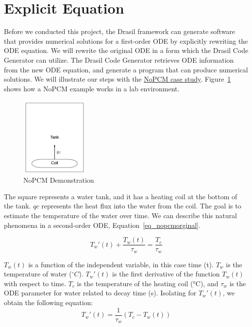 \section{Explicit Equation}
Before we conducted this project, the Drasil framework can generate software that provides numerical solutions for a first-order ODE by explicitly rewriting the ODE equation. We will rewrite the original ODE in a form which the Drasil Code Generator can utilize. The Drasil Code Generator retrieves ODE information from the new ODE equation, and generate a program that can produce numerical solutions. We will illustrate our steps with the \href{https://jacquescarette.github.io/Drasil/examples/nopcm/SRS/srs/NoPCM_SRS.html#Sec:IMs}{NoPCM case study}. Figure~\ref{fig_nopcm} shows how a NoPCM example works in a lab environment.
\begin{figure}[ht]
\centering
\includegraphics[width=0.3\textwidth]{figures/NoPCM.png}
\caption{NoPCM Demonstration}
\label{fig_nopcm}
\end{figure}
The square represents a water tank, and it has a heating coil at the bottom of the tank. $qc$ represents the heat flux into the water from the coil. The goal is to estimate the temperature of the water over time. We can describe this natural phenomena in a second-order ODE, Equation~\ref{eq_nopcmorginal}.

\begin{equation} \label{eq_nopcmorginal}
	T_{w}'(t) +  \frac {T_{w}(t)}{\tau_{w}} = \frac{T_{c}}{\tau_{w}}
\end{equation}

$T_w(t)$ is a function of the independent variable, in this case time (t). $T_w$ is the temperature of water ($ ^\circ C $). $T_w'(t)$ is the first derivative of the function $T_w(t)$ with respect to time. $T_c$ is the temperature of the heating coil (°C), and $\tau_w$ is the ODE parameter for water related to decay time (s). Isolating for $T_w'(t)$, we obtain the following equation:
\begin{equation} \label{eq_nopcmderive}
	T_{w}'(t) = \frac{1}{\tau_{w}} (T_{c} - T_{w}(t))
\end{equation}

